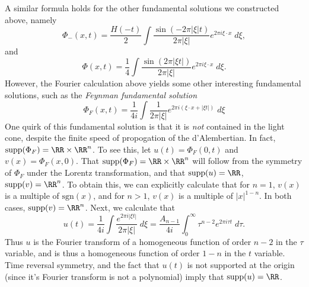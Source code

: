 \begin{example}
    A similar formula holds for the other fundamental solutions we constructed above, namely
    \[ \Phi_-(x,t) = \frac{H(-t)}{2} \int \frac{\sin(- 2 \pi |\xi| t)}{2 \pi |\xi|} e^{2 \pi i \xi \cdot x}\; d\xi, \]
    and
    \[ \Phi(x,t) = \frac{1}{4} \int \frac{\sin(2 \pi |\xi t|)}{2 \pi |\xi|} e^{2 \pi i \xi \cdot x}\; d\xi. \]
    However, the Fourier calculation above yields some other interesting fundamental solutions, such as the \emph{Feynman fundamental solution}
    \[ \Phi_F(x,t) = \frac{1}{4i} \int \frac{1}{2 \pi |\xi|} e^{2 \pi i (\xi \cdot x + |\xi t|)}\; d\xi  \]
    One quirk of this fundamental solution is that it is \emph{not} contained in the light cone, despite the finite speed of propogation of the d'Alembertian. In fact, $\text{supp}(\Phi_F) = \RR \times \RR^n$. To see this, let $u(t) = \Phi_F(0,t)$ and $v(x) = \Phi_F(x,0)$. That $\text{supp}(\Phi_F) = \RR \times \RR^n$ will follow from the symmetry of $\Phi_F$ under the Lorentz transformation, and that $\text{supp}(u) = \RR$, $\text{supp}(v) = \RR^n$. To obtain this, we can explicitly calculate that for $n = 1$, $v(x)$ is a multiple of $\text{sgn}(x)$, and for $n > 1$, $v(x)$ is a multiple of $|x|^{1-n}$. In both cases, $\text{supp}(v) = \RR^n$. Next, we calculate that
    \[ u(t) = \frac{1}{4i} \int \frac{e^{2 \pi i |\xi t|}}{2\pi|\xi|}\; d\xi = \frac{A_{n-1}}{4i} \int_0^\infty \tau^{n-2} e^{2 \pi i \tau t}\; d\tau. \]
    Thus $u$ is the Fourier transform of a homogeneous function of order $n-2$ in the $\tau$ variable, and is thus a homogeneous function of order $1-n$ in the $t$ variable. Time reversal symmetry, and the fact that $u(t)$ is not supported at the origin (since it's Fourier transform is not a polynomial) imply that $\text{supp}(u) = \RR$.


\end{example}
